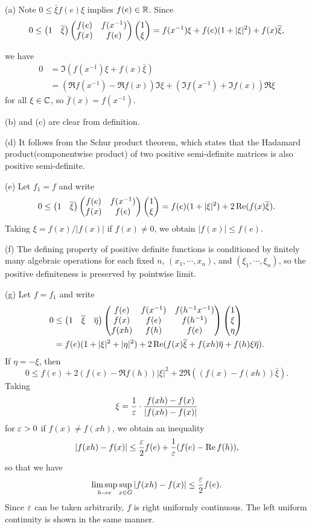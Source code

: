 \documentclass[a4paper]{article}
\begin{document}
\begin{pf}
(a)
Note $0\le\bar\xi f(e)\xi$ implies $f(e)\in\mathbb{R}$.
Since
\[0\le\begin{pmatrix}1&\overline\xi\end{pmatrix}\begin{pmatrix}f(e)&f(x^{-1})\\f(x)&f(e)\end{pmatrix}\begin{pmatrix}1\\\xi\end{pmatrix}=f(x^{-1})\xi+f(e)(1+|\xi|^2)+f(x)\overline\xi,\]

we have
\begin{align*}
0&=\Im(f(x^{-1})\xi+f(x)\bar\xi)\\
&=(\Re f(x^{-1})-\Re f(x))\Im\xi+(\Im f(x^{-1})+\Im f(x))\Re\xi
\end{align*}
for all $\xi\in\mathbb{C}$, so $\bar f(x)=f(x^{-1})$.

(b) and (c) are clear from definition.

(d) It follows from the Schur product theorem, which states that the Hadamard product(componentwise product) of two positive semi-definite matrices is also positive semi-definite.

(e)
Let $f_1=f$ and write
\[0\le\begin{pmatrix}1&\overline\xi\end{pmatrix}\begin{pmatrix}f(e)&f(x^{-1})\\f(x)&f(e)\end{pmatrix}\begin{pmatrix}1\\\xi\end{pmatrix}=f(e)(1+|\xi|^2)+2\operatorname{Re}(f(x)\overline\xi).\]
Taking $\xi=f(x)/|f(x)|$ if $f(x)\ne0$, we obtain $|f(x)|\le f(e)$.

(f)
The defining property of positive definite functions is conditioned by finitely many algebraic operations for each fixed $n$, $(x_1,\cdots,x_n)$, and $(\xi_1,\cdots,\xi_n)$, so the positive definiteness is preserved by pointwise limit.

(g)
Let $f=f_1$ and write
\begin{align*}
0&\le\begin{pmatrix}1&\overline\xi&\overline\eta\end{pmatrix}\begin{pmatrix}f(e)&f(x^{-1})&f(h^{-1}x^{-1})\\f(x)&f(e)&f(h^{-1})\\f(xh)&f(h)&f(e)\end{pmatrix}\begin{pmatrix}1\\\xi\\\eta\end{pmatrix}\\
&=f(e)(1+|\xi|^2+|\eta|^2)+2\operatorname{Re}(f(x)\overline\xi+f(xh)\overline\eta+f(h)\xi\overline\eta).
\end{align*}
If $\eta=-\xi$, then
\[0\le f(e)+2(f(e)-\Re f(h))|\xi|^2+2\Re((f(x)-f(xh))\bar\xi).\]
Taking
\[\xi=\frac1{\varepsilon}\cdot\frac{f(xh)-f(x)}{|f(xh)-f(x)|}\]
for $\varepsilon>0$ if $f(x)\ne f(xh)$, we obtain an inequality
\[|f(xh)-f(x)|\le\frac{\varepsilon}2f(e)+\frac1{\varepsilon}(f(e)-\operatorname{Re} f(h)),\]
so that we have
\[\limsup_{h\to e}\sup_{x\in G}|f(xh)-f(x)|\le\frac{\varepsilon}2f(e).\]
Since $\varepsilon$ can be taken arbitrarily, $f$ is right uniformly continuous.
The left uniform continuity is shown in the same manner.
\end{pf}
\end{document}
